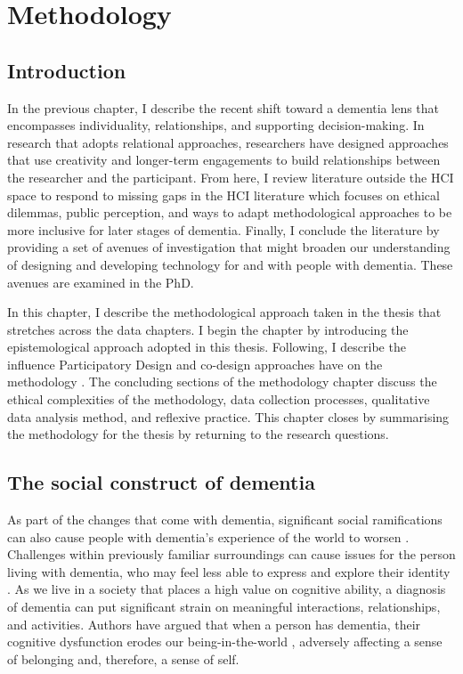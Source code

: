 \chapter{Methodology}
\label{Methodology}

\section{Introduction}
\label{Method:Intro}

In the previous chapter, I describe the recent shift toward a dementia lens that encompasses individuality, relationships, and supporting decision-making. In research that adopts relational approaches, researchers have designed approaches that use creativity and longer-term engagements to build relationships between the researcher and the participant. From here, I review literature outside the HCI space to respond to missing gaps in the HCI literature which focuses on ethical dilemmas, public perception, and ways to adapt methodological approaches to be more inclusive for later stages of dementia. Finally, I conclude the literature by providing a set of avenues of investigation that might broaden our understanding of designing and developing technology for and with people with dementia. These avenues are examined in the PhD.

In this chapter, I describe the methodological approach taken in the thesis that stretches across the data chapters. I begin the chapter by introducing the epistemological approach adopted in this thesis. Following, I describe the influence Participatory Design and co-design approaches have on the methodology \citep{duarte2018participatory}. The concluding sections of the methodology chapter discuss the ethical complexities of the methodology, data collection processes, qualitative data analysis method, and reflexive practice. This chapter closes by summarising the methodology for the thesis by returning to the research questions.  

\section{The social construct of dementia}
\label{social construct}
As part of the changes that come with dementia, significant social ramifications can also cause people with dementia's experience of the world to worsen \citep{hampson_dementia:_2016}. Challenges within previously familiar surroundings can cause issues for the person living with dementia, who may feel less able to express and explore their identity \citep{john_killick_claire_craig_creativity_2012}. As we live in a society that places a high value on cognitive ability, a diagnosis of dementia can put significant strain on meaningful interactions, relationships, and activities. Authors have argued that when a person has dementia, their cognitive dysfunction erodes our being-in-the-world \citep{hampson_dementia:_2016}, adversely affecting a sense of belonging and, therefore, a sense of self.

